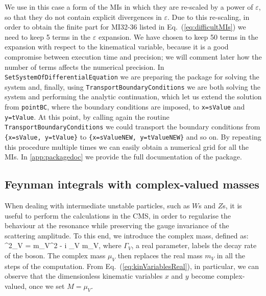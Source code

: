 \documentclass[final,1p,times]{elsarticle}
\begin{document}
We use in this case a form of the MIs in which they are re-scaled by a power of $\varepsilon$, so that they do not contain explicit divergences in $\varepsilon$. 
Due to this re-scaling, in order to obtain the finite part for MI32-36 listed in Eq.~(\ref{eq:difficultMIs}) we need to keep 5 terms in the $\varepsilon$ expansion.
We have chosen to keep 50
terms in the expansion with respect to the kinematical variable, because it is a good compromise between execution time and precision; we will comment later 
how the number of terms affects the numerical precision. In \texttt{SetSystemOfDifferentialEquation} 
we are preparing the package for solving the system and, finally, using \texttt{Transport\-Boundary\-Conditions}
we are both solving the system and performing the analytic continuation, which let
us extend the solution from \texttt{pointBC}, where the boundary conditions are imposed, to \texttt{x=sValue} and 
\texttt{y=tValue}. At this point, by calling again the routine \texttt{Transport\-Boundary\-Conditions} we could transport the boundary conditions from \texttt{\{x=sValue, y=tValue\}} to 
\texttt{\{x=sValueNEW, y=tValueNEW\}} and so on. By repeating this procedure multiple times we can easily obtain a numerical grid for all the MIs. In \ref{app:packagedoc} we provide the full documentation of the package.

\subsection{Feynman integrals with complex-valued masses}

When dealing with intermediate unstable particles, such as $W$s and $Z$s, it is useful to perform the calculations in the CMS, in order to regularise the behaviour at the resonance while preserving the gauge invariance of the scattering amplitude.
To this end, we introduce the complex mass, defined as:
\be 
\label{eq:complex_mass}
\mu^2_V = m_V^2 - i \Gamma_V m_V,
\ee
where $\Gamma_V$, a real parameter, labels the decay rate of the boson.
The complex mass $\mu_V$ then replaces the real mass $m_V$ in all the steps of the computation.
From Eq.~(\ref{eq:kinVariablesReal}), in particular, we can observe that the
dimensionless kinematic variables $x$ and $y$ become complex-valued, once we set $M=\mu_V$.
\end{document}
